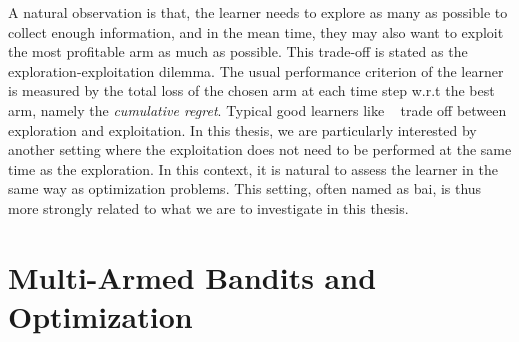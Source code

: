 A natural observation is that, the learner needs to explore as many as possible to collect enough information, and in the mean time, they may also want to exploit the most profitable arm as much as possible. This trade-off is stated as the \gls{exploration-exploitation dilemma}. The usual performance criterion of the learner is measured by the total loss of the chosen arm at each time step w.r.t the best arm, namely the \emph{cumulative regret}. Typical good learners like \UCB~\citep{auer2002ucb} trade off between exploration and exploitation. In this thesis, we are particularly interested by another setting where the exploitation does not need to be performed at the same time as the exploration. In this context, it is natural to assess the learner in the same way as optimization problems. This setting, often named as \gls{bai}, is thus more strongly related to what we are to investigate in this thesis.



\section{Multi-Armed Bandits and Optimization}\label{sec:intro.mab}
    
